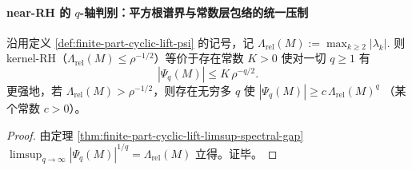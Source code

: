 \paragraph{near-RH 的 \(q\)-轴判别：平方根谱界与常数层包络的统一压制}
\begin{corollary}\label{cor:finite-part-near-rh-q-axis-envelope}
沿用定义 \ref{def:finite-part-cyclic-lift-psi} 的记号，记
\(
\Lambda_{\mathrm{rel}}(M):=\max_{k\ge2}|\lambda_k|.
\)
则 kernel-RH（\(\Lambda_{\mathrm{rel}}(M)\le\rho^{-1/2}\)）等价于存在常数 \(K>0\) 使对一切 \(q\ge1\) 有
\[
|\Psi_q(M)|\le K\,\rho^{-q/2}.
\]
更强地，若 \(\Lambda_{\mathrm{rel}}(M)>\rho^{-1/2}\)，则存在无穷多 \(q\) 使
\(
|\Psi_q(M)|\ge c\,\Lambda_{\mathrm{rel}}(M)^q
\)
（某个常数 \(c>0\)）。
\end{corollary}
\begin{proof}
由定理 \ref{thm:finite-part-cyclic-lift-limsup-spectral-gap}
\(
\limsup_{q\to\infty}|\Psi_q(M)|^{1/q}=\Lambda_{\mathrm{rel}}(M)
\)
立得。证毕。
\end{proof}

